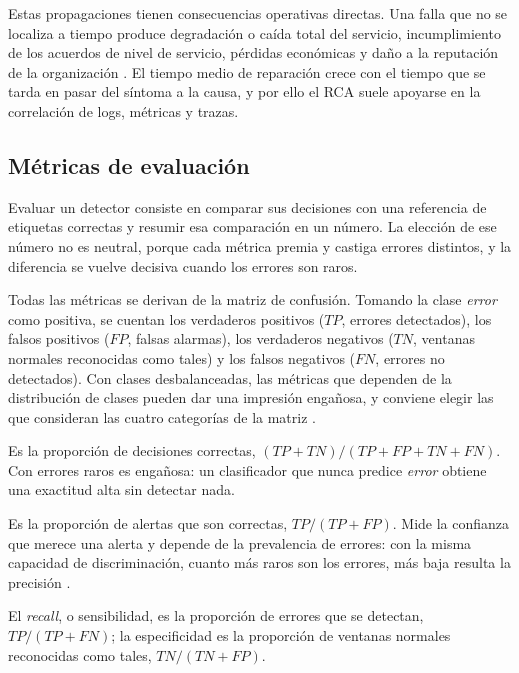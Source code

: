 Estas propagaciones tienen consecuencias operativas directas. Una falla que no se localiza a tiempo produce degradación o caída total del servicio, incumplimiento de los acuerdos de nivel de servicio, pérdidas económicas y daño a la reputación de la organización \cite{wang2024_rca}. El tiempo medio de reparación crece con el tiempo que se tarda en pasar del síntoma a la causa, y por ello el RCA suele apoyarse en la correlación de logs, métricas y trazas.

\subsection{Métricas de evaluación}\label{sec:mt_metricas}

Evaluar un detector consiste en comparar sus decisiones con una referencia de etiquetas correctas y resumir esa comparación en un número. La elección de ese número no es neutral, porque cada métrica premia y castiga errores distintos, y la diferencia se vuelve decisiva cuando los errores son raros.

Todas las métricas se derivan de la matriz de confusión. Tomando la clase \emph{error} como positiva, se cuentan los verdaderos positivos ($TP$, errores detectados), los falsos positivos ($FP$, falsas alarmas), los verdaderos negativos ($TN$, ventanas normales reconocidas como tales) y los falsos negativos ($FN$, errores no detectados). Con clases desbalanceadas, las métricas que dependen de la distribución de clases pueden dar una impresión engañosa, y conviene elegir las que consideran las cuatro categorías de la matriz \cite{diallo2025_metrics}.

Es la proporción de decisiones correctas, $(TP + TN)/(TP + FP + TN + FN)$. Con errores raros es engañosa: un clasificador que nunca predice \emph{error} obtiene una exactitud alta sin detectar nada.

Es la proporción de alertas que son correctas, $TP/(TP + FP)$. Mide la confianza que merece una alerta y depende de la prevalencia de errores: con la misma capacidad de discriminación, cuanto más raros son los errores, más baja resulta la precisión \cite{richardson2024_roc}.

El \textit{recall}, o sensibilidad, es la proporción de errores que se detectan, $TP/(TP + FN)$; la especificidad es la proporción de ventanas normales reconocidas como tales, $TN/(TN + FP)$.

